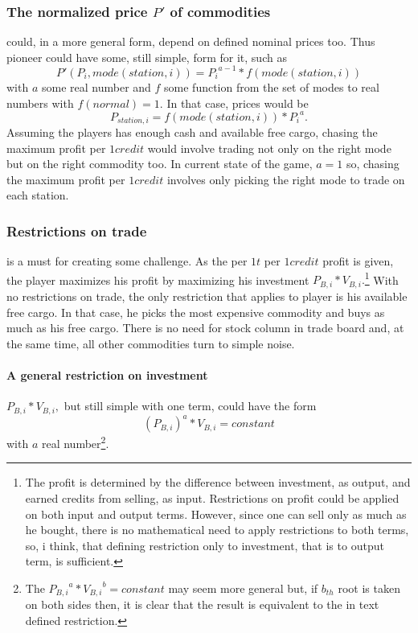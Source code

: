 \documentclass[]{article}
\begin{document}
\subsubsection{The normalized price $P'$ of commodities}\label{general_normalized_prices} could, in a more general form, depend on defined nominal prices too. Thus pioneer could have some, still simple, form for it, such as \begin{equation}\label{eq:general_normalized_price}
	P'(P_{i},mode(station,i))={P_{i}}^{a-1}*f(mode(station,i))
\end{equation}
 with $a$ some real number and $f$ some function from the set of modes to real numbers with $f(normal)=1$. In that case, prices would be 
\begin{equation}\label{eq:general_price}
	 P_{station,i}= f(mode(station,i))*{P_{i}}^{a}.
\end{equation}
 Assuming the players has enough cash and available free cargo, chasing the maximum profit per $1credit$ would involve trading not only  on the right mode but on the right commodity too. In current state of the game, $a=1$ so, chasing the maximum profit per $1credit$ involves only picking the right mode to trade on each station.
\subsubsection{Restrictions on trade} is a must for creating some challenge. As the per $1t$ per $1credit$ profit is given, the player maximizes his profit by maximizing his investment $P_{B,i}*V_{B,i}.$\footnote{The profit is determined by the difference between investment, as output, and earned credits from selling, as input. Restrictions on profit could be applied on both input and output terms. However, since one can sell only as much as he bought, there is no mathematical need to apply restrictions to both terms, so, i think, that defining restriction only to investment, that is to output term, is sufficient.} With no restrictions on trade, the only restriction that applies to player is his available free cargo. In that case, he picks the most expensive commodity and buys as much as his free cargo. There is no need for stock column in trade board and, at the same time, all other commodities turn to simple noise.
\paragraph{A general restriction on investment} $P_{B,i}*V_{B,i},$ but still simple with one term,  could have the form
\[
	{(P_{B,i})}^a*V_{B,i}=constant
\]
 with $a$ real number\footnote{The ${P_{B,i}}^a*{V_{B,i}}^b=constant$ may seem more general but, if $b_{th}$ root is taken on both sides then, it is clear that the result is equivalent to the in text defined restriction.}.
\end{document}

